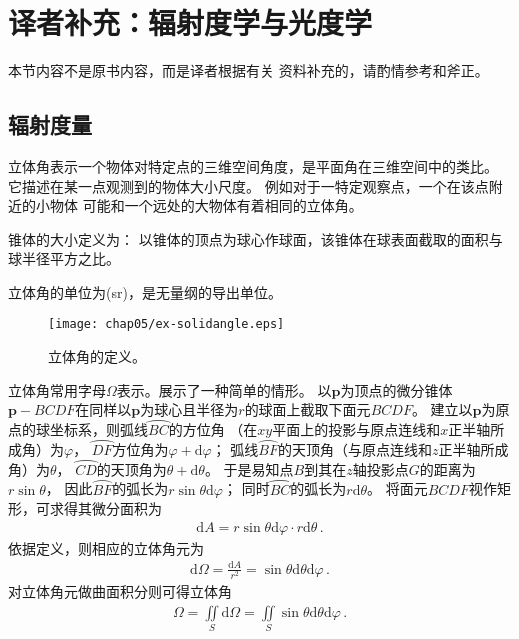 \section{译者补充：辐射度学与光度学}\label{sec:译者补充：辐射度学与光度学}

\begin{remark}
      本节内容不是原书内容，而是译者根据有关
      资料\citep{978-7-5640-0658-7,wiki:solidangle,GB3102.6-93}补充的，请酌情参考和斧正。
\end{remark}

\subsection{辐射度量}\label{sub:辐射度量}
立体角表示一个物体对特定点的三维空间角度，是平面角在三维空间中的类比。
它描述在某一点观测到的物体大小尺度。
例如对于一特定观察点，一个在该点附近的小物体
可能和一个远处的大物体有着相同的立体角。
\begin{definition}
      锥体的大小定义为：
      以锥体的顶点为球心作球面，该锥体在球表面截取的面积与球半径平方之比。
\end{definition}
立体角的单位为(sr)，是无量纲的导出单位。

\begin{figure}[htbp]
      \centering\texttt{[image: chap05/ex-solidangle.eps]}
      \caption{立体角的定义。}
      \label{fig:5.ex01}
\end{figure}

立体角常用字母$\varOmega$表示。展示了一种简单的情形。
以$\bm p$为顶点的微分锥体${\bm p}-BCDF$在同样以$\bm p$为球心且半径为$r$的球面上截取下面元$BCDF$。
建立以$\bm p$为原点的球坐标系，则弧线$\wideparen{BC}$的方位角
（在$xy$平面上的投影与原点连线和$x$正半轴所成角）为$\varphi$，
$\wideparen{DF}$方位角为$\varphi+\mathrm{d}\varphi$；
弧线$\wideparen{BF}$的天顶角（与原点连线和$z$正半轴所成角）为$\theta$，
$\wideparen{CD}$的天顶角为$\theta+\mathrm{d}\theta$。
于是易知点$B$到其在$z$轴投影点$G$的距离为$r\sin\theta$，
因此$\wideparen{BF}$的弧长为$r\sin\theta\mathrm{d}\varphi$；
同时$\wideparen{BC}$的弧长为$r\mathrm{d}\theta$。
将面元$BCDF$视作矩形，可求得其微分面积为
\begin{align}
      \mathrm{d}A=r\sin\theta\mathrm{d}\varphi\cdot r\mathrm{d}\theta\, .
\end{align}
依据定义，则相应的立体角元为
\begin{align}
      \mathrm{d}\varOmega=\frac{\mathrm{d}A}{r^2}=\sin\theta\mathrm{d}\theta\mathrm{d}\varphi\, .
\end{align}
对立体角元做曲面积分则可得立体角
\begin{align}
      \varOmega=\iint\limits_S \mathrm{d}\varOmega=\iint\limits_S \sin\theta\mathrm{d}\theta\mathrm{d}\varphi\, .
\end{align}

